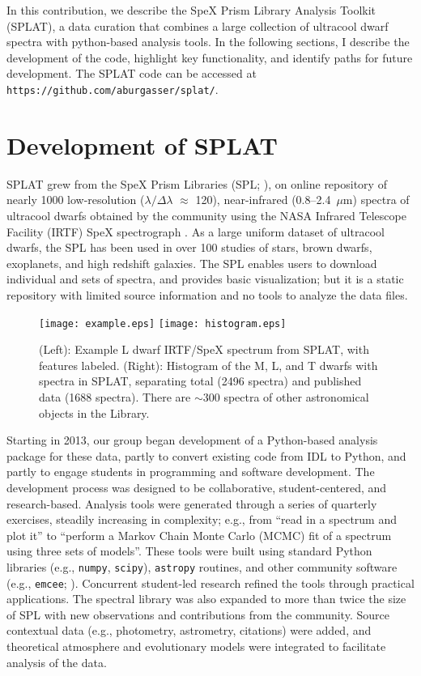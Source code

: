 \documentclass[usenatbib]{basi}
\begin{document}
In this contribution, we describe the SpeX Prism Library Analysis Toolkit (SPLAT), a data curation that combines a large collection of ultracool dwarf spectra with python-based analysis tools. In the following sections, I describe the development of the code, highlight key functionality, and identify paths for future development.  The SPLAT code can be accessed at \texttt{https://github.com/aburgasser/splat/}.
 
\section{Development of SPLAT}\label{s:dev}

SPLAT grew from the SpeX Prism Libraries (SPL; \citealt{2014ASInC..11....7B}), on online repository of  nearly 1000 low-resolution ($\lambda/\Delta\lambda$ $\approx$ 120), near-infrared (0.8--2.4~$\mu$m) spectra of ultracool dwarfs obtained by the community using the NASA Infrared Telescope Facility (IRTF) SpeX spectrograph \citep{2003PASP..115..362R}. As a large uniform dataset of ultracool dwarfs, the SPL
has been used in over 100 studies of stars, brown dwarfs, exoplanets, and high redshift galaxies. The SPL  enables users to download individual and sets of spectra, and provides basic visualization; but it is a static repository with limited source information and no tools to analyze the data files.

\begin{figure}[t]
  \centerline{\texttt{[image: example.eps]}
  \texttt{[image: histogram.eps]}}
  \caption{(Left): Example L dwarf IRTF/SpeX spectrum from SPLAT, with features labeled. (Right): Histogram of the M, L, and T dwarfs with spectra in SPLAT, separating total (2496 spectra) and published data (1688 spectra). There are $\sim$300 spectra of other astronomical objects in the Library.}
  \end{figure}

Starting in 2013, our group began development of a Python-based analysis package for these data, partly to convert existing code from IDL to Python, and partly to engage students in programming and software development. The development process was designed to be collaborative, student-centered, and research-based. Analysis tools were generated through a series of quarterly exercises, steadily increasing in complexity; e.g., from ``read in a spectrum and plot it'' to ``perform a Markov Chain Monte Carlo {(MCMC)} fit of a spectrum using three sets of models''. These tools were built using standard Python libraries (e.g., \texttt{numpy}, \texttt{scipy}), \texttt{astropy} routines, and other community software (e.g., \texttt{emcee}; \citealt{2013PASP..125..306F}). Concurrent student-led research refined the tools through practical applications. The spectral library was also expanded to more than twice the size of SPL with new observations and contributions from the community. Source contextual data (e.g., photometry, astrometry, citations) were added, and theoretical atmosphere and evolutionary models were integrated to facilitate analysis of the data.
\end{document}
